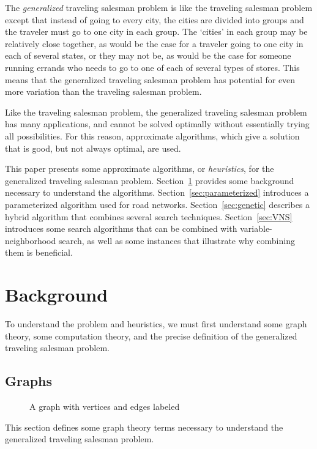 \documentclass{sig-alternate}
\begin{document}
The \textit{generalized} traveling salesman problem is like the traveling salesman problem except that instead of going to every city, the cities are divided into groups and the traveler must go to one city in each group. The `cities' in each group may be relatively close together, as would be the case for a traveler going to one city in each of several states, or they may not be, as would be the case for someone running errands who needs to go to one of each of several types of stores. This means that the generalized traveling salesman problem has potential for even more variation than the traveling salesman problem. 

Like the traveling salesman problem, the generalized traveling salesman problem has many applications, and cannot be solved optimally without essentially trying all possibilities. For this reason, approximate algorithms, which give a solution that is good, but not always optimal, are used. 

This paper presents some approximate algorithms, or \textit{heuristics}, for the generalized traveling salesman problem. Section~\ref{sec:background} provides some background necessary to understand the algorithms. Section~\ref{sec:parameterized} introduces a parameterized algorithm used for road networks. Section~\ref{sec:genetic} describes a hybrid algorithm that combines several search techniques. Section~\ref{sec:VNS} introduces some search algorithms that can be combined with variable-neighborhood search, as well as some instances that illustrate why combining them is beneficial. 


\section{Background}
\label{sec:background}
To understand the problem and heuristics, we must first understand some graph theory, some computation theory, and the precise definition of the generalized traveling salesman problem. 

\subsection{Graphs}
\label{subs:graphs}
\begin{figure}
\centering
{}
\caption{A graph with vertices and edges labeled}
\label{fig:graph}
\end{figure}
This section defines some graph theory terms necessary to understand the generalized traveling salesman problem. 
\end{document}
